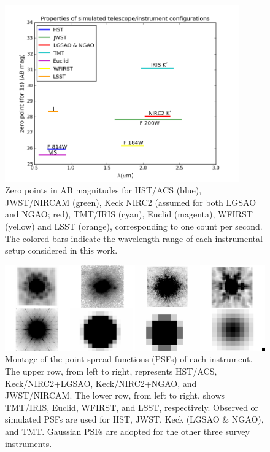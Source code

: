 \documentclass[a4paper,11pt]{article}
\begin{document}
\begin{figure}
\begin{center}
\includegraphics[width=0.9\textwidth]{figures/wavelength_zp.png}
\end{center}
\caption{Zero points in AB magnitudes for HST/ACS (blue), JWST/NIRCAM (green), Keck NIRC2  (assumed for both LGSAO and NGAO; red), TMT/IRIS (cyan), Euclid (magenta), WFIRST (yellow) and LSST (orange), corresponding to one count per second. The colored bars indicate the wavelength range of each instrumental setup considered in this work.}
\label{fig:zp_wavelength}
\end{figure}


\begin{figure}
\begin{center}
\includegraphics[width=1.0\textwidth]{figures/PSF_montage.png}
\end{center}
\caption{Montage of the point spread functions (PSFs) of each instrument. The upper row, from left to right, represents HST/ACS, Keck/NIRC2+LGSAO, Keck/NIRC2+NGAO, and JWST/NIRCAM. The lower row, from left to right, shows TMT/IRIS, Euclid, WFIRST, and LSST, respectively. Observed or simulated PSFs are used for HST, JWST, Keck (LGSAO \& NGAO), and TMT. Gaussian PSFs are adopted for the other three survey instruments.}
\label{fig:PSF_montage}
\end{figure}
\end{document}

